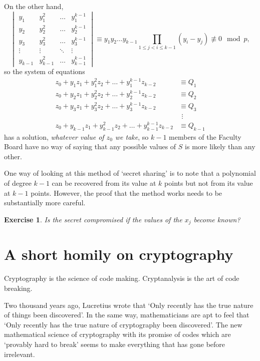 \documentclass[12pt,a4paper]{article}
\theoremstyle{plain}
\newtheorem{exercise}[theorem]{Exercise}
\theoremstyle{definition}
\begin{document}
On the other hand,
\[
\begin{vmatrix}
y_{1}&y_{1}^{2}&\hdots&y_{1}^{k-1}\\
y_{2}&y_{2}^{2}&\hdots&y_{2}^{k-1}\\
y_{3}&y_{3}^{2}&\hdots&y_{3}^{k-1}\\
\vdots&\vdots&\ddots&\vdots\\
y_{k-1}&y_{k-1}^{2}&\hdots&y_{k-1}^{k-1}
\end{vmatrix}
\equiv y_{1}y_{2}\ldots y_{k-1}
\prod_{1\leq j<i\leq k-1}(y_{i}-y_{j})\not\equiv 0\mod{p},\]
so the system of equations
\begin{align*}
z_{0}+y_{1}z_{1}+y_{1}^{2}z_{2}+\hdots+y_{1}^{k-1}z_{k-2}
&\equiv Q_{1}\\
z_{0}+y_{2}z_{1}+y_{2}^{2}z_{2}+\hdots+y_{2}^{k-1}z_{k-2}
&\equiv Q_{2}\\
z_{0}+y_{3}z_{1}+y_{3}^{2}z_{2}+\hdots+y_{3}^{k-1}z_{k-2}
&\equiv Q_{3}\\
&\ \,\vdots\\
z_{0}+y_{k-1}z_{1}+y_{k-1}^{2}z_{2}+
\hdots+y_{k-1}^{k-1}z_{k-2}&\equiv Q_{k-1}
\end{align*}
has a solution, \emph{whatever value of $z_{0}$ we take},
so $k-1$ members of the Faculty Board have no
way of saying that any possible values of $S$ is
more likely than any other.

One way of looking at this method of `secret sharing'
is to note that a polynomial
of degree $k-1$ can be recovered from its value at $k$ points
but not from its value at $k-1$ points. However, the proof
that the method works needs to be substantially more careful.
\begin{exercise} Is the secret compromised if the
values of the $x_{j}$ become known?
\end{exercise}    
\section{A short homily on cryptography}
Cryptography is the science of
code making. Cryptanalysis is the
art of
code  breaking.

Two thousand years ago, Lucretius wrote that
`Only recently has the true nature of things
been discovered'. In the same way, mathematicians
are apt to feel that `Only recently has
the true nature of cryptography been
discovered'. The new mathematical science
of cryptography with its promise of codes
which are `provably hard to break' seems
to make everything that has gone before
irrelevant.
\end{document}
